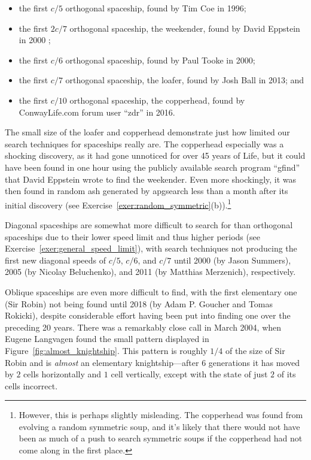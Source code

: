 \begin{itemize}
	\item the first $c/5$ orthogonal spaceship, found by Tim Coe in 1996;\smallskip
	
	\item the first $2c/7$ orthogonal spaceship, the weekender, found by David Eppstein in 2000 \cite{Epp02};\smallskip
	
	\item the first $c/6$ orthogonal spaceship, found by Paul Tooke in 2000;\smallskip
	
	\item the first $c/7$ orthogonal spaceship, the loafer, found by Josh Ball in 2013; and\smallskip
	
	\item the first $c/10$ orthogonal spaceship, the copperhead, found by ConwayLife.com forum user ``zdr'' in 2016.\smallskip
\end{itemize}

The small size of the loafer and copperhead demonstrate just how limited our search techniques for spaceships really are. The copperhead especially was a shocking discovery, as it had gone unnoticed for over 45 years of Life, but it could have been found in one hour using the publicly available search program ``gfind'' that David Eppstein wrote to find the weekender. Even more shockingly, it was then found in random ash generated by apgsearch less than a month after its initial discovery (see Exercise~\ref{exer:random_symmetric}(b)).\footnote{However, this is perhaps slightly misleading. The copperhead was found from evolving a random symmetric soup, and it's likely that there would not have been as much of a push to search symmetric soups if the copperhead had not come along in the first place.}

Diagonal spaceships are somewhat more difficult to search for than orthogonal spaceships due to their lower speed limit and thus higher periods (see Exercise~\ref{exer:general_speed_limit}), with search techniques not producing the first new diagonal speeds of $c/5$, $c/6$, and $c/7$ until 2000 (by Jason Summers), 2005 (by Nicolay Beluchenko), and 2011 (by Matthias Merzenich), respectively.

Oblique spaceships are even more difficult to find, with the first elementary one (Sir Robin) not being found until 2018 (by Adam P. Goucher and Tomas Rokicki), despite considerable effort having been put into finding one over the preceding 20 years. There was a remarkably close call in March 2004, when Eugene Langvagen found the small pattern displayed in Figure~\ref{fig:almost_knightship}. This pattern is roughly $1/4$ of the size of Sir Robin and is \emph{almost} an elementary knightship---after $6$ generations it has moved by $2$ cells horizontally and $1$ cell vertically, except with the state of just $2$ of its cells incorrect.

